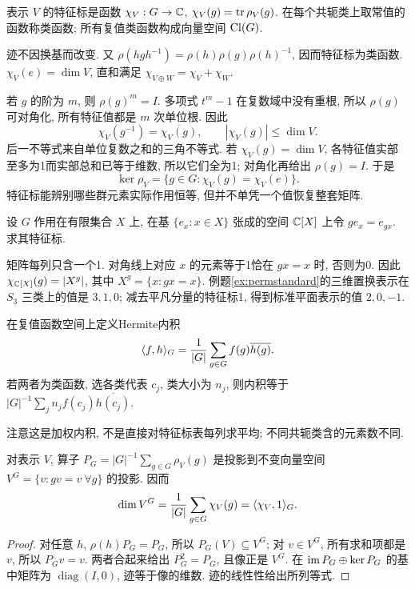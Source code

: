 \begin{definition}
表示 $V$ 的特征标是函数 $\chi_V:G\to\mathbb C$, $\chi_V(g)=\operatorname{tr}\rho_V(g)$. 在每个共轭类上取常值的函数称类函数; 所有复值类函数构成向量空间 $\operatorname{Cl}(G)$.
\end{definition}
迹不因换基而改变. 又 $\rho(hgh^{-1})=\rho(h)\rho(g)\rho(h)^{-1}$, 因而特征标为类函数. $\chi_V(e)=\dim V$, 直和满足 $\chi_{V\oplus W}=\chi_V+\chi_W$.

若 $g$ 的阶为 $m$, 则 $\rho(g)^m=I$. 多项式 $t^m-1$ 在复数域中没有重根, 所以 $\rho(g)$ 可对角化, 所有特征值都是 $m$ 次单位根. 因此
\[
 \chi_V(g^{-1})=\overline{\chi_V(g)},\qquad |\chi_V(g)|\le\dim V.
\]
后一不等式来自单位复数之和的三角不等式. 若 $\chi_V(g)=\dim V$, 各特征值实部至多为1而实部总和已等于维数, 所以它们全为1; 对角化再给出 $\rho(g)=I$. 于是
\begin{equation}\label{eq:character-kernel}
 \ker\rho_V=\{g\in G:\chi_V(g)=\chi_V(e)\}.
\end{equation}
特征标能辨别哪些群元素实际作用恒等, 但并不单凭一个值恢复整套矩阵.

\begin{example}
设 $G$ 作用在有限集合 $X$ 上, 在基 $\{e_x:x\in X\}$ 张成的空间 $\mathbb C[X]$ 上令 $g e_x=e_{gx}$. 求其特征标.
\end{example}
\begin{solution}
矩阵每列只含一个1. 对角线上对应 $x$ 的元素等于1恰在 $gx=x$ 时, 否则为0. 因此 $\chi_{\mathbb C[X]}(g)=|X^g|$, 其中 $X^g=\{x:gx=x\}$. 例题\ref{ex:permstandard}的三维置换表示在 $S_3$ 三类上的值是 $3,1,0$; 减去平凡分量的特征标1, 得到标准平面表示的值 $2,0,-1$.
\end{solution}

\begin{definition}
在复值函数空间上定义Hermite内积
\[
 \langle f,h\rangle_G=\frac1{|G|}\sum_{g\in G}f(g)\overline{h(g)}.
\]
若两者为类函数, 选各类代表 $c_j$, 类大小为 $n_j$, 则内积等于 $|G|^{-1}\sum_j n_j f(c_j)\overline{h(c_j)}$.
\end{definition}
注意这是加权内积, 不是直接对特征标表每列求平均; 不同共轭类含的元素数不同.

\begin{proposition}\label{prop:reynolds}
对表示 $V$, 算子 $P_G=|G|^{-1}\sum_{g\in G}\rho_V(g)$ 是投影到不变向量空间 $V^G=\{v:gv=v\ \forall g\}$ 的投影. 因而
\[
 \dim V^G=\frac1{|G|}\sum_{g\in G}\chi_V(g)=\langle \chi_V,1\rangle_G.
\]
\end{proposition}
\begin{proof}
对任意 $h$, $\rho(h)P_G=P_G$, 所以 $P_G(V)\subseteq V^G$; 对 $v\in V^G$, 所有求和项都是 $v$, 所以 $P_Gv=v$. 两者合起来给出 $P_G^2=P_G$, 且像正是 $V^G$. 在 $\operatorname{im} P_G\oplus\ker P_G$ 的基中矩阵为 $\operatorname{diag}(I,0)$, 迹等于像的维数. 迹的线性性给出所列等式.
\end{proof}

